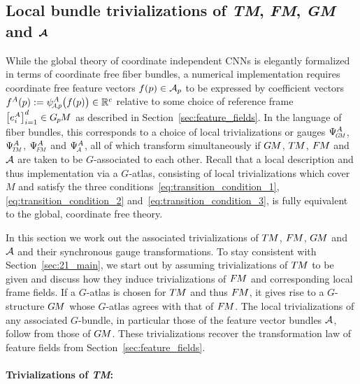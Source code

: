 

\subsection%
    [Local bundle trivializations of \texorpdfstring{\textit{TM}, \textit{FM}, \textit{GM} and $            \A $}{TM, GM and A}]%
    {Local bundle trivializations of \texorpdfstring{\textit{TM}, \textit{FM}, \textit{GM} and $\boldsymbol{\mathcal{A}}$}{TM, GM and A}}
\label{sec:bundle_trivializations}

While the global theory of coordinate independent CNNs is elegantly formalized in terms of coordinate free fiber bundles, a numerical implementation requires coordinate free feature vectors $f(p)\in\mathcal{A}_p$ to be expressed by coefficient vectors ${f^A(p):=\psiAp^A\big(f(p)\big)\in\R^c}$ relative to some choice of reference frame $\big[e_{i}^A\big]_{i=1}^d\in G_{\mkern-1.3mu p}\mkern-1.2muM$ as described in Section~\ref{sec:feature_fields}.
In the language of fiber bundles, this corresponds to a choice of local trivializations or gauges $\PsiGM^A$, $\PsiTM^A$, $\PsiFM^A$ and $\PsiA^A$, all of which transform simultaneously if $G\mkern-1.4muM$, $T\mkern-1.5muM$, $F\mkern-1.5muM$ and $\A$ are taken to be $G$-associated to each other.
Recall that a local description and thus implementation via a $G$-atlas, consisting of local trivializations which cover $M$ and satisfy the three conditions~\eqref{eq:transition_condition_1}, \eqref{eq:transition_condition_2} and~\eqref{eq:transition_condition_3}, is fully equivalent to the global, coordinate free theory.


In this section we work out the associated trivializations of $T\mkern-1.5muM$, $F\mkern-1.5muM$, $G\mkern-1.4muM$ and $\A$ and their synchronous gauge transformations.
To stay consistent with Section~\ref{sec:21_main}, we start out by assuming trivializations of $T\mkern-1.5muM$ to be given and discuss how they induce trivializations of $F\mkern-1.5muM$ and corresponding local frame fields.
If a $G$-atlas is chosen for $T\mkern-1.5muM$ and thus $F\mkern-1.5muM$, it gives rise to a $G$-structure $G\mkern-1.4muM$ whose $G$-atlas agrees with that of $F\mkern-1.5muM$.
The local trivializations of any associated $G$-bundle, in particular those of the feature vector bundles $\A$, follow from those of $G\mkern-1.4muM$.
These trivializations recover the transformation law of feature fields from Section~\ref{sec:feature_fields}.







\paragraph{Trivializations of \textit{TM}:}

